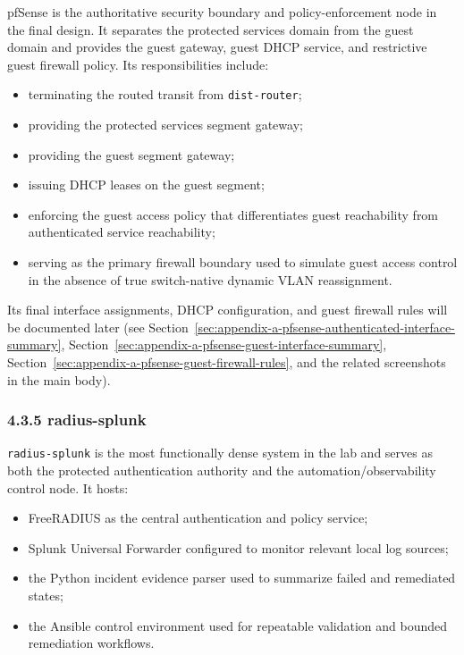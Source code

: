 \documentclass[11pt]{article}
\begin{document}
pfSense is the authoritative security boundary and policy-enforcement node in the final design. It separates the protected services domain from the guest domain and provides the guest gateway, guest DHCP service, and restrictive guest firewall policy. Its responsibilities include:

\begin{itemize}
    \item terminating the routed transit from \texttt{dist-router};
    \item providing the protected services segment gateway;
    \item providing the guest segment gateway;
    \item issuing DHCP leases on the guest segment;
    \item enforcing the guest access policy that differentiates guest reachability from authenticated service reachability;
    \item serving as the primary firewall boundary used to simulate guest access control in the absence of true switch-native dynamic VLAN reassignment.
\end{itemize}

Its final interface assignments, DHCP configuration, and guest firewall rules will be documented later (see Section~\ref{sec:appendix-a-pfsense-authenticated-interface-summary}, Section~\ref{sec:appendix-a-pfsense-guest-interface-summary}, Section~\ref{sec:appendix-a-pfsense-guest-firewall-rules}, and the related screenshots in the main body).

\subsubsection{4.3.5 radius-splunk}
\label{sec:radius-splunk-role}

\texttt{radius-splunk} is the most functionally dense system in the lab and serves as both the protected authentication authority and the automation/observability control node. It hosts:

\begin{itemize}
    \item FreeRADIUS as the central authentication and policy service;
    \item Splunk Universal Forwarder configured to monitor relevant local log sources;
    \item the Python incident evidence parser used to summarize failed and remediated states;
    \item the Ansible control environment used for repeatable validation and bounded remediation workflows.
\end{itemize}
\end{document}
